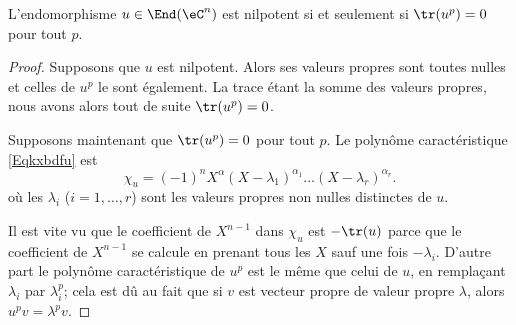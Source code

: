 \begin{lemma}   \label{LemzgNOjY}
	L'endomorphisme \( u\in\End(\eC^n)\) est nilpotent si et seulement si \( \tr(u^p)=0\) pour tout \( p\).
\end{lemma}

\begin{proof}
	Supposons que \( u\) est nilpotent. Alors ses valeurs propres sont toutes nulles et celles de \( u^p\) le sont également. La trace étant la somme des valeurs propres, nous avons alors tout de suite \( \tr(u^p)=0\).

	Supposons maintenant que \( \tr(u^p)=0\) pour tout \( p\). Le polynôme caractéristique \eqref{Eqkxbdfu} est
	\begin{equation}    \label{EqfnCqWq}
		\chi_u=(-1)^nX^{\alpha}(X-\lambda_1)^{\alpha_1}\ldots (X-\lambda_r)^{\alpha_r}.
	\end{equation}
	où les \( \lambda_i\) (\( i=1,\ldots, r\)) sont les valeurs propres non nulles distinctes de \( u\).

	Il est vite vu que le coefficient de \( X^{n-1}\) dans \( \chi_u\) est \( -\tr(u)\) parce que le coefficient de \( X^{n-1}\) se calcule en prenant tous les \( X\) sauf une fois \( -\lambda_i\). D'autre part le polynôme caractéristique de \( u^p \) est le même que celui de \( u\), en remplaçant \( \lambda_i\) par \( \lambda_i^p\); cela est dû au fait que si \( v\) est vecteur propre de valeur propre \( \lambda\), alors \( u^pv=\lambda^pv\).


\end{proof}
